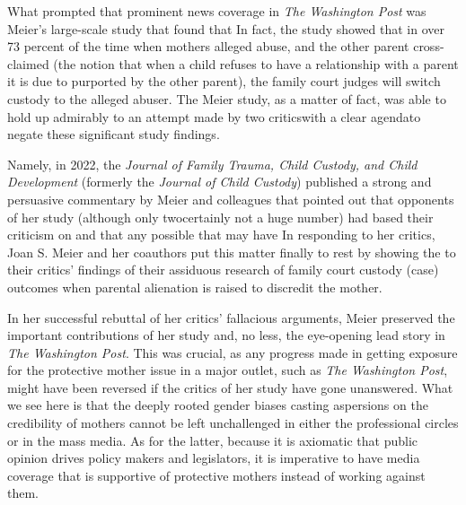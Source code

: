 What prompted that prominent news coverage in \textit{The Washington Post}
was Meier's large-scale study that found that  In fact, the study showed that in over 73 percent of the time when
mothers alleged abuse, and the other parent cross-claimed  (the notion that when a child refuses to have a relationship
with a parent it is due to purported  by the other parent), the family court judges will switch custody to the alleged abuser.
The Meier study, as a matter of fact, was able to hold up admirably to
an attempt made by two critics\mdash{}with a clear agenda\mdash{}to
negate these significant study findings. \pfl{}

Namely, in 2022, the \textit{Journal of Family Trauma, Child Custody, and
Child Development} (formerly the \textit{Journal of Child Custody}) published a
strong and persuasive commentary by Meier and colleagues that pointed
out that opponents of her study (although only two\mdash{}certainly not
a huge number) had based their criticism on  and that any possible
 that may have  In responding to her critics, 
Joan S. Meier and her coauthors put 
this matter finally to rest by showing the 
to their critics' findings  of their assiduous research of family court custody (case) outcomes when parental
alienation is raised to discredit the mother. \pfl{}

In her successful rebuttal of her critics' fallacious arguments, Meier
preserved the important contributions of her study and, no less, the
eye-opening lead story in \textit{The Washington Post}. This was crucial, as any
progress made in getting exposure for the protective mother issue in a
major outlet, such as \textit{The Washington Post}, might have been reversed if
the critics of her study have gone unanswered. What we see here is that
the deeply rooted gender biases casting aspersions on the credibility of
mothers cannot be left unchallenged in either the professional circles
or in the mass media. As for the latter, because it is axiomatic that public
opinion drives policy makers and legislators, it is imperative to have 
media coverage that is supportive of protective mothers instead of working
against them. \pfl{}


